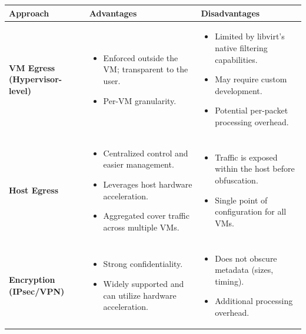 \documentclass{article}
\begin{document}
\begin{table}[ht]
\centering
\begin{tabularx}{\linewidth}{|p{2.5cm}|X|X|}
\hline
\textbf{Approach} & \textbf{Advantages} & \textbf{Disadvantages} \\
\hline
\textbf{VM Egress (Hypervisor-level)} & 
\begin{itemize}[leftmargin=*,noitemsep]
    \item Enforced outside the VM; transparent to the user.
    \item Per-VM granularity.
\end{itemize} & 
\begin{itemize}[leftmargin=*,noitemsep]
    \item Limited by libvirt’s native filtering capabilities.
    \item May require custom development.
    \item Potential per-packet processing overhead.
\end{itemize} \\
\hline
\textbf{Host Egress} & 
\begin{itemize}[leftmargin=*,noitemsep]
    \item Centralized control and easier management.
    \item Leverages host hardware acceleration.
    \item Aggregated cover traffic across multiple VMs.
\end{itemize} & 
\begin{itemize}[leftmargin=*,noitemsep]
    \item Traffic is exposed within the host before obfuscation.
    \item Single point of configuration for all VMs.
\end{itemize} \\
\hline
\textbf{Encryption (IPsec/VPN)} & 
\begin{itemize}[leftmargin=*,noitemsep]
    \item Strong confidentiality.
    \item Widely supported and can utilize hardware acceleration.
\end{itemize} & 
\begin{itemize}[leftmargin=*,noitemsep]
    \item Does not obscure metadata (sizes, timing).
    \item Additional processing overhead.
\end{itemize} \\

\end{tabularx}
\end{table}
\end{document}
